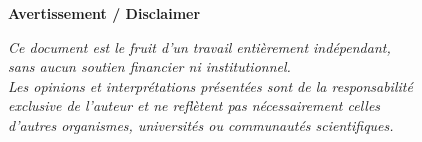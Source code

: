 \begin{titlepage}
	\thispagestyle{empty}
	\centering
	
	\vspace*{3cm}
	
	{\Large \textbf{Avertissement / Disclaimer}}
	
	\vspace{2cm}
	
	\begin{minipage}{0.85\textwidth}
		\centering
		\textit{
			Ce document est le fruit d’un travail entièrement indépendant, \\
			sans aucun soutien financier ni institutionnel. \\
			Les opinions et interprétations présentées sont de la responsabilité \\
			exclusive de l’auteur et ne reflètent pas nécessairement celles \\
			d’autres organismes, universités ou communautés scientifiques.
		}
	\end{minipage}
	
	\vfill
	
\end{titlepage}
